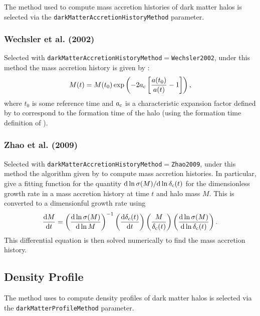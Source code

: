 The method used to compute mass accretion histories of dark matter halos is selected via the {\tt darkMatterAccretionHistoryMethod} parameter.

\subsubsection{Wechsler et al. (2002)}

Selected with {\tt darkMatterAccretionHistoryMethod}$=${\tt Wechsler2002}, under this method the mass accretion history is given by \citep{wechsler_concentrations_2002}:
\begin{equation}
M(t) = M(t_0) \exp \left( - 2 a_{\rm c} \left[ {a(t_0)\over a(t)}-1 \right] \right),
\end{equation}
where $t_0$ is some reference time and $a_{\rm c}$ is a characteristic expansion factor defined by \cite{wechsler_concentrations_2002} to correspond to the formation time of the halo (using the formation time definition of \citealt{bullock_profiles_2001}).

\subsubsection{Zhao et al. (2009)}

Selected with {\tt darkMatterAccretionHistoryMethod}$=${\tt Zhao2009}, under this method the algorithm given by \cite{zhao_accurate_2009} to compute mass accretion histories. In particular, \cite{zhao_accurate_2009} give a fitting function for the quantity ${\rm d} \ln \sigma(M)/{\rm d} \ln  \delta_{\rm c}(t)$ for the dimensionless growth rate in a mass accretion history at time $t$ and halo mass $M$. This is converted to a dimensionful growth rate using
\begin{equation}
 {{\rm d} M \over {\rm d} t} = \left({{\rm d} \ln \sigma(M) \over {\rm d} \ln M}\right)^{-1} \left({{\rm d} \delta_c(t) \over {\rm d} t}\right) \left( {M \over \delta_{\rm c}(t)} \right) \left({{\rm d} \ln \sigma(M) \over {\rm d} \ln \delta_{\rm c}(t)}\right).
\end{equation}
This differential equation is then solved numerically to find the mass accretion history.

\subsection{Density Profile}

The method uses to compute density profiles of dark matter halos is selected via the {\tt darkMatterProfileMethod} parameter.

